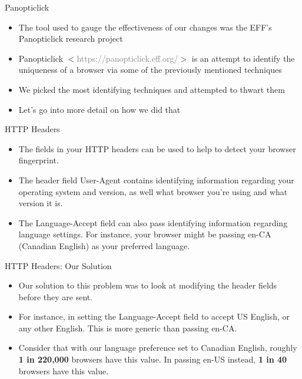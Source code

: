 \begin{frame}[fragile,t]{Panopticlick}
	\begin{itemize}
		\item The tool used to gauge the effectiveness of our changes was the EFF's Panopticlick research project
		\item Panopticlick $<$\textcolor{gray}{https://panopticlick.eff.org/}$>$ is an attempt to identify the uniqueness of a browser via some of the previously mentioned techniques
		\item We picked the most identifying techniques and attempted to thwart them
		\item Let's go into more detail on how we did that
	\end{itemize}
\end{frame}

\begin{frame}[fragile,t]{HTTP Headers}
	\begin{itemize}
		\item The fields in your HTTP headers can be used to help to detect your browser fingerprint.
		\item The header field User-Agent contains identifying information regarding your operating system and version, as well what browser you're using and what version it is.
		\item The Language-Accept field can also pass identifying information regarding language settings. For instance, your browser might be passing en-CA (Canadian English) as your preferred language.
	\end{itemize}
\end{frame}

\begin{frame}[fragile,t]{HTTP Headers: Our Solution}
	\begin{itemize}
		\item Our solution to this problem was to look at modifying the header fields before they are sent.
		\item For instance, in setting the Language-Accept field to accept US English, or any other English. This is more generic than passing en-CA.
		\item Consider that with our language preference set to Canadian English, roughly \textbf{1 in 220,000} browsers have this value. In passing en-US instead, \textbf{1 in 40} browsers have this value. 
	\end{itemize}
\end{frame}

